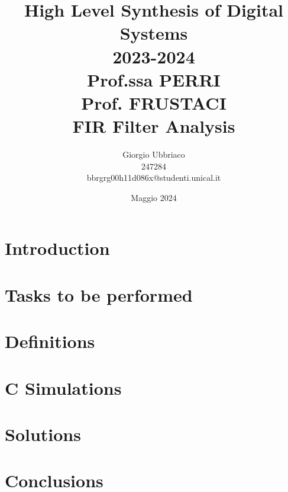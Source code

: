 \documentclass{article}
\title{High Level Synthesis of Digital Systems\\2023-2024\\Prof.ssa PERRI\\Prof. FRUSTACI\\FIR Filter Analysis}
\author{Giorgio Ubbriaco \\ 247284 \\ bbrgrg00h11d086x@studenti.unical.it}
\date{Maggio 2024}
\begin{document}
    \maketitle
    \renewcommand{\contentsname}{Index}
    \tableofcontents
    \newpage

    \lstlistoflistings
    \listoffigures
    \listoftables
    \newpage
    
    \section{Introduction}
    
    \newpage
    
    \section{Tasks to be performed}
    
    \newpage

    \section{Definitions}
    
    \newpage

    \section{C Simulations}
    
    \newpage
    
    \section{Solutions}
    
    \newpage

    \section{Conclusions}
    
    \newpage
    
\end{document}
